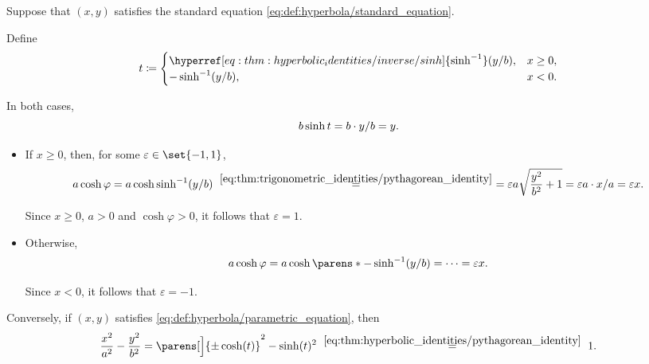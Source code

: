 \begin{defproof}
   Suppose that \( (x, y) \) satisfies the standard equation \eqref{eq:def:hyperbola/standard_equation}.

  Define
  \begin{equation*}
    t \coloneqq \begin{cases}
      \hyperref[eq:thm:hyperbolic_identities/inverse/sinh]{\sinh^{-1}}(\ifrac y b), &x \geq 0, \\
      -\sinh^{-1}(\ifrac y b),                                                      &x < 0.
    \end{cases}
  \end{equation*}

  In both cases,
  \begin{equation*}
    b \sinh t = b \cdot \ifrac y b = y.
  \end{equation*}

  \begin{itemize}
    \item If \( x \geq 0 \), then, for some \( \varepsilon \in \set{ -1, 1 } \),
    \begin{equation*}
      a \cosh\varphi
      =
      a \cosh\sinh^{-1}(\ifrac y b)
      \reloset {\eqref{eq:thm:trigonometric_identities/pythagorean_identity}} =
      =
      \varepsilon a \sqrt{ \frac {y^2} {b^2} + 1 }
      =
      \varepsilon a \cdot \ifrac x a
      =
      \varepsilon x.
    \end{equation*}

    Since \( x \geq 0 \), \( a > 0 \) and \( \cosh\varphi > 0 \), it follows that \( \varepsilon = 1 \).

    \item Otherwise,
    \begin{equation*}
      a \cosh\varphi
      =
      a \cosh\parens*{ -\sinh^{-1}(\ifrac y b) }
      =
      \cdots
      =
      \varepsilon x.
    \end{equation*}

    Since \( x < 0 \), it follows that \( \varepsilon = -1 \).
  \end{itemize}

   Conversely, if \( (x, y) \) satisfies \eqref{eq:def:hyperbola/parametric_equation}, then
  \begin{equation*}
    \frac {x^2} {a^2} - \frac {y^2} {b^2}
    =
    \parens[\Big]{ \pm \cosh(t) }^2 - \sinh(t)^2
    \reloset {\eqref{eq:thm:hyperbolic_identities/pythagorean_identity}} =
    1.
  \end{equation*}


\end{defproof}
